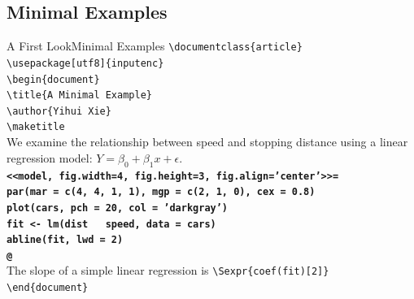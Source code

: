 \documentclass[10pt]{beamer}
\begin{document}
\subsection{Minimal Examples}
\begin{frame}{A First Look}{Minimal Examples}
	{\tt \textbackslash documentclass\{article\}}\\
	{\tt \textbackslash usepackage[utf8]\{inputenc\}}\\
	{\tt \textbackslash begin\{document\}}\\
	{\tt \textbackslash title\{A Minimal Example\}}\\
	{\tt \textbackslash author\{Yihui Xie\}}\\
	{\tt \textbackslash maketitle}\\
	We examine the relationship between speed and stopping distance using a linear regression model: $Y = \beta_0 + \beta_1 x + \epsilon$.\\
	{\tt \textbf{<<model, fig.width=4, fig.height=3, fig.align='center'>>=}}\\	
	{\tt \textbf{par(mar = c(4, 4, 1, 1), mgp = c(2, 1, 0), cex = 0.8)}}\\
	{\tt \textbf{plot(cars, pch = 20, col = 'darkgray')}}\\
	{\tt \textbf{fit <- lm(dist ~ speed, data = cars)}}\\
	{\tt \textbf{abline(fit, lwd = 2)}}\\
	{\tt \textbf{@}}\\
	The slope of a simple linear regression is
	{\tt \textbackslash Sexpr\{coef(fit)[2]\}}\\
	{\tt \textbackslash end\{document\}}\\
\end{frame}
\end{document}
